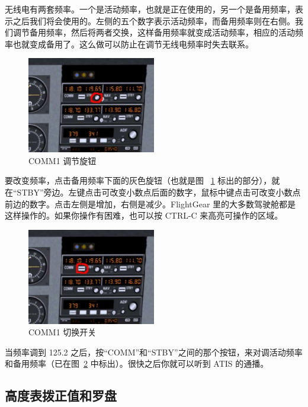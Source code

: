 无线电有两套频率。一个是活动频率，也就是正在使用的，另一个是备用频率，表示之后我们将会使用的。左侧的五个数字表示活动频率，而备用频率则在右侧。我们调节备用频率，然后将两者交换，这样备用频率就变成活动频率，相应的活动频率也就变成备用了。这么做可以防止在调节无线电频率时失去联系。

\begin{figure}[!htp]
\centering
\includegraphics[width=0.5\textwidth]{comm1_knob}
\caption{COMM1 调节旋钮\label{comm1knob}}
\end{figure}

要改变频率，点击备用频率下面的灰色旋钮（也就是图 ~\ref{comm1knob} 标出的部分），就在“STBY”旁边。左键点击可改变小数点后面的数字，鼠标中键点击可改变小数点前边的数字。点击左侧是增加，右侧是减少。FlightGear 里的大多数驾驶舱都是这样操作的。如果你操作有困难，也可以按 CTRL-C 来高亮可操作的区域。

\begin{figure}[!htp]
\centering
\includegraphics[width=0.5\textwidth]{comm1_switch}
\caption{COMM1 切换开关\label{comm1switch}}
\end{figure}

当频率调到 125.2 之后，按“COMM”和“STBY”之间的那个按钮，来对调活动频率和备用频率（已在图~\ref{comm1switch} 中标出）。很快之后你就可以听到 ATIS 的通播。

\subsection{高度表拨正值和罗盘}

